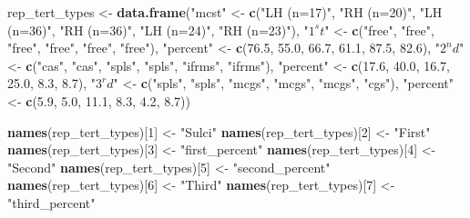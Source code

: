 \documentclass[
]{article}
\newenvironment{Shaded}{\begin{snugshade}}{\end{snugshade}}
\newcommand{\DecValTok}[1]{\textcolor[rgb]{0.00,0.00,0.81}{#1}}
\newcommand{\FloatTok}[1]{\textcolor[rgb]{0.00,0.00,0.81}{#1}}
\newcommand{\KeywordTok}[1]{\textcolor[rgb]{0.13,0.29,0.53}{\textbf{#1}}}
\newcommand{\NormalTok}[1]{#1}
\newcommand{\StringTok}[1]{\textcolor[rgb]{0.31,0.60,0.02}{#1}}
\begin{document}
\begin{Shaded}
\begin{Highlighting}[]
\NormalTok{rep_tert_types <-}\StringTok{ }\KeywordTok{data.frame}\NormalTok{(}\StringTok{"mcst"}\NormalTok{ <-}\StringTok{ }\KeywordTok{c}\NormalTok{(}\StringTok{"LH (n=17)"}\NormalTok{, }\StringTok{"RH (n=20)"}\NormalTok{, }\StringTok{"LH (n=36)"}\NormalTok{, }\StringTok{"RH (n=36)"}\NormalTok{, }\StringTok{"LH (n=24)"}\NormalTok{, }\StringTok{"RH (n=23)"}\NormalTok{),}
                \StringTok{"$1^st$"}\NormalTok{ <-}\StringTok{ }\KeywordTok{c}\NormalTok{(}\StringTok{"free"}\NormalTok{, }\StringTok{"free"}\NormalTok{, }\StringTok{"free"}\NormalTok{, }\StringTok{"free"}\NormalTok{, }\StringTok{"free"}\NormalTok{, }\StringTok{"free"}\NormalTok{),}
                \StringTok{"percent"}\NormalTok{ <-}\StringTok{ }\KeywordTok{c}\NormalTok{(}\FloatTok{76.5}\NormalTok{, }\FloatTok{55.0}\NormalTok{, }\FloatTok{66.7}\NormalTok{, }\FloatTok{61.1}\NormalTok{, }\FloatTok{87.5}\NormalTok{, }\FloatTok{82.6}\NormalTok{),}
                \StringTok{"$2^nd$"}\NormalTok{ <-}\StringTok{ }\KeywordTok{c}\NormalTok{(}\StringTok{"cas"}\NormalTok{, }\StringTok{"cas"}\NormalTok{, }\StringTok{"spls"}\NormalTok{, }\StringTok{"spls"}\NormalTok{, }\StringTok{"ifrms"}\NormalTok{, }\StringTok{"ifrms"}\NormalTok{),}
                \StringTok{"percent"}\NormalTok{ <-}\StringTok{ }\KeywordTok{c}\NormalTok{(}\FloatTok{17.6}\NormalTok{, }\FloatTok{40.0}\NormalTok{, }\FloatTok{16.7}\NormalTok{, }\FloatTok{25.0}\NormalTok{, }\FloatTok{8.3}\NormalTok{, }\FloatTok{8.7}\NormalTok{),}
                \StringTok{"$3^rd$"}\NormalTok{ <-}\StringTok{ }\KeywordTok{c}\NormalTok{(}\StringTok{"spls"}\NormalTok{, }\StringTok{"spls"}\NormalTok{, }\StringTok{"mcgs"}\NormalTok{, }\StringTok{"mcgs"}\NormalTok{, }\StringTok{"mcgs"}\NormalTok{, }\StringTok{"cgs"}\NormalTok{),}
                \StringTok{"percent"}\NormalTok{ <-}\StringTok{ }\KeywordTok{c}\NormalTok{(}\FloatTok{5.9}\NormalTok{, }\FloatTok{5.0}\NormalTok{, }\FloatTok{11.1}\NormalTok{, }\FloatTok{8.3}\NormalTok{, }\FloatTok{4.2}\NormalTok{, }\FloatTok{8.7}\NormalTok{))}

\KeywordTok{names}\NormalTok{(rep_tert_types)[}\DecValTok{1}\NormalTok{] <-}\StringTok{ "Sulci"}
\KeywordTok{names}\NormalTok{(rep_tert_types)[}\DecValTok{2}\NormalTok{] <-}\StringTok{ "First"}
\KeywordTok{names}\NormalTok{(rep_tert_types)[}\DecValTok{3}\NormalTok{] <-}\StringTok{ "first_percent"}
\KeywordTok{names}\NormalTok{(rep_tert_types)[}\DecValTok{4}\NormalTok{] <-}\StringTok{ "Second"}
\KeywordTok{names}\NormalTok{(rep_tert_types)[}\DecValTok{5}\NormalTok{] <-}\StringTok{ "second_percent"}
\KeywordTok{names}\NormalTok{(rep_tert_types)[}\DecValTok{6}\NormalTok{] <-}\StringTok{ "Third"}
\KeywordTok{names}\NormalTok{(rep_tert_types)[}\DecValTok{7}\NormalTok{] <-}\StringTok{ "third_percent"}


\end{Highlighting}
\end{Shaded}
\end{document}
